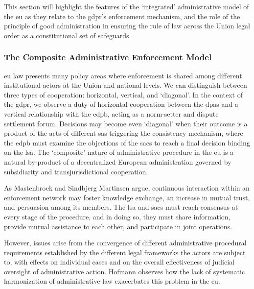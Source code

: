 This section will highlight the features of the `integrated' administrative model of the \gls{eu} as they relate to the \gls{gdpr}'s enforcement mechanism, and the role of the principle of good administration in ensuring the rule of law across the Union legal order as a constitutional set of safeguards.

\subsubsection{The Composite Administrative Enforcement Model}
\label{sec:ch2-composite-model}

\gls{eu} law presents many policy areas where enforcement is shared among different institutional actors at the Union and national levels.\autocite[138]{hofmannCompositeDecisionMaking2009}
We can distinguish between three types of cooperation: horizontal, vertical, and `diagonal'.\autocite[408]{hofmannAdministrativeLawPolicy2012}
In the context of the \gls{gdpr}, we observe a duty of horizontal cooperation between the \glspl{dpa} and a vertical relationship with the \gls{edpb}, acting as a norm-setter and dispute settlement forum.
Decisions may become even `diagonal' when their outcome is a product of the acts of different \glspl{sa} triggering the consistency mechanism, where the \gls{edpb} must examine the objections of the \glspl{sac} to reach a final decision binding on the \gls{lsa}.\autocite[267]{mustertCrossborderEnforcementGDPR}
The `composite' nature of administrative procedure in the \gls{eu} is a natural by-product of a decentralized European administration governed by subsidiarity and transjurisdictional cooperation.\autocite[91--92]{mihaescu-evansRightGoodAdministration2015}

As Mastenbroek and Sindbjerg Martinsen argue, continuous interaction within an enforcement network may foster knowledge exchange, an increase in mutual trust, and persuasion among its members.\autocite[428]{mastenbroekFillingGapEuropean2018}
The \gls{lsa} and \glspl{sac} must reach consensus at every stage of the procedure,\autocite[465]{hofmannmustertScholtenHandbook2023} and in doing so, they must share information,\autocite[60(1)]{GDPR} provide mutual assistance to each other, and participate in joint operations.\autocite[60(2)]{GDPR}

However, issues arise from the convergence of different administrative procedural requirements established by the different legal frameworks the actors are subject to, with effects on individual cases and on the overall effectiveness of judicial oversight of administrative action.\autocite[137]{hofmannCompositeDecisionMaking2009} 
Hofmann observes how the lack of systematic harmonization of administrative law exacerbates this problem in the \gls{eu}.\autocite[137]{hofmannCompositeDecisionMaking2009}

